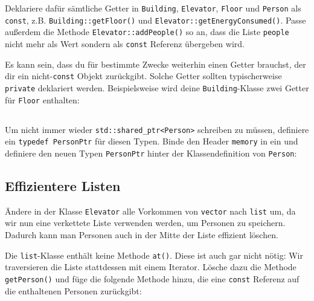 Deklariere dafür sämtliche Getter in \lstinline{Building}, \lstinline{Elevator}, \lstinline{Floor} und \lstinline{Person} als \lstinline{const}, z.B. \lstinline{Building::getFloor()} und \lstinline{Elevator::getEnergyConsumed()}.
Passe außerdem die Methode \lstinline{Elevator::addPeople()} so an, dass die Liste \lstinline{people} nicht mehr als Wert sondern als \lstinline{const} Referenz übergeben wird.

Es kann sein, dass du für bestimmte Zwecke weiterhin einen Getter brauchst, der dir ein nicht-\lstinline{const} Objekt zurückgibt.
Solche Getter sollten typischerweise \lstinline{private} deklariert werden.
Beispielsweise wird deine \lstinline{Building}-Klasse zwei Getter für \lstinline{Floor} enthalten:


\subsection{}
Um nicht immer wieder \lstinline{std::shared_ptr<Person>} schreiben zu müssen, definiere ein \lstinline{typedef PersonPtr} für diesen Typen.
Binde den Header \lstinline{memory} in  ein und definiere den neuen Typen \lstinline{PersonPtr} hinter der Klassendefinition von \lstinline{Person}:


\subsection{Effizientere Listen}
Ändere in der Klasse \lstinline{Elevator} alle Vorkommen von \lstinline{vector} nach \lstinline{list} um, da wir nun eine verkettete Liste verwenden werden, um Personen zu speichern.
Dadurch kann man Personen auch in der Mitte der Liste effizient löschen.

Die \lstinline{list}-Klasse enthält keine Methode \lstinline{at()}.
Diese ist auch gar nicht nötig:
Wir traversieren die Liste stattdessen mit einem Iterator.
Lösche dazu die Methode \lstinline{getPerson()} und füge die folgende Methode hinzu, die eine \lstinline{const} Referenz auf die enthaltenen Personen zurückgibt:

